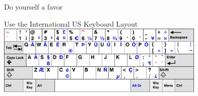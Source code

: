 \documentclass[xetex, onlymath]{beamer}
\begin{document}
\begin{frame}{Do yourself a favor}
  \begin{alertblock}{Use the International US Keyboard Layout}
    \centering
    \vspace{3pt}
    \includegraphics[height=9em]{figs/kbd-us-intl}
  \end{alertblock}
\end{frame}
\end{document}
